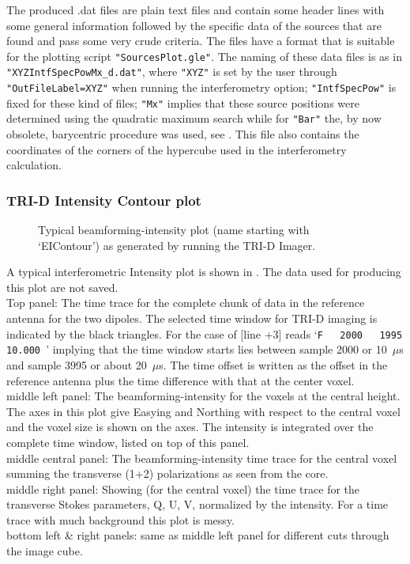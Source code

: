 The produced .dat files are plain text files and contain some header lines with some general information followed by the specific data of the sources that are found and pass some very crude criteria. The files have a format that is suitable for the plotting script \verb!"SourcesPlot.gle"!. The naming of these data files is as in \verb!"XYZIntfSpecPowMx_d.dat"!, where \verb!"XYZ"! is set by the user through \verb!"OutFileLabel=XYZ"! when running the interferometry option; \verb!"IntfSpecPow"! is fixed for these kind of files; \verb!"Mx"! implies that these source positions were determined using the quadratic maximum search while for \verb!"Bar"! the, by now obsolete, barycentric procedure was used, see .
This file also contains the coordinates of the corners of the hypercube used in the interferometry calculation.


\subsubsection{TRI-D Intensity Contour plot}

\begin{figure}[th]
	\caption{Typical beamforming-intensity plot (name starting with `EIContour') as generated by running the TRI-D Imager.}	 
\end{figure}

A typical interferometric Intensity plot is shown in . The data used for producing this plot are not saved.
\\Top panel: The time trace for the complete chunk of data in the reference antenna for the two dipoles. The selected time window for TRI-D imaging is indicated by the black triangles. For the case of  [line +3] reads `\verb!F   2000   1995 10.000 !' implying that the time window starts lies between sample 2000 or 10~$\mu$s and sample 3995 or about 20~$\mu$s. The time offset is written as the offset in the reference antenna plus the time difference with that at the center voxel.
\\middle left panel: The beamforming-intensity for the voxels at the central height. The axes in this plot give Easying and Northing with respect to the central voxel and the voxel size is shown on the axes. The intensity is integrated over the complete time window, listed on top of this panel.
\\middle central panel: The beamforming-intensity time trace for the central voxel summing the transverse (1+2) polarizations as seen from the core.
\\middle right panel: Showing (for the central voxel) the time trace for the transverse Stokes parameters, Q, U, V, normalized by the intensity. For a time trace with much background this plot is messy.
\\bottom left \& right panels: same as middle left panel for different cuts through the image cube.

